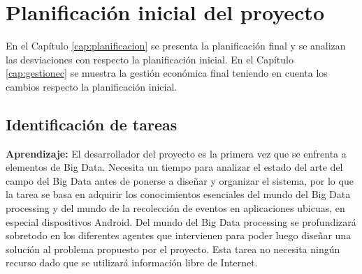 \chapter{Planificación inicial del proyecto}\label{cap:planini}

En el Capítulo \ref{cap:planificacion} se presenta la planificación final y se analizan las desviaciones con respecto la planificación inicial. En el Capítulo \ref{cap:gestionec} se muestra la gestión económica final teniendo en cuenta los cambios respecto la planificación inicial.

\section{Identificación de tareas}
\textbf{Aprendizaje:} El desarrollador del proyecto es la primera vez que se enfrenta a elementos de Big Data. Necesita un tiempo para analizar el estado del arte del campo del Big Data antes de ponerse a diseñar y organizar el sistema, por lo que la tarea se basa en adquirir los conocimientos esenciales del mundo del Big Data processing y del mundo de la recolección de eventos en aplicaciones ubicuas, en especial dispositivos Android. Del mundo del Big Data processing se profundizará sobretodo en los diferentes agentes que intervienen para poder luego diseñar una solución al problema propuesto por el proyecto. Esta tarea no necesita ningún recurso dado que se utilizará información libre de Internet.

